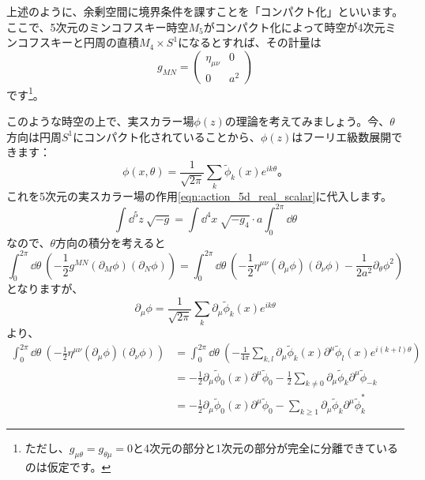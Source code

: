 \documentclass[unicode,a4paper,10pt]{ltjsarticle}
\begin{document}
上述のように、余剰空間に境界条件を課すことを「コンパクト化」といいます。ここで、5次元のミンコフスキー時空$M_{5}$がコンパクト化によって時空が4次元ミンコフスキーと円周の直積$M_{4}\times S^{1}$になるとすれば、その計量は
\begin{equation}
   g_{MN}
   =
   \begin{pmatrix}
      \eta_{\mu\nu} & 0 \\
      0 & a^2
   \end{pmatrix}
\end{equation}
です\footnote{
   ただし、$g_{\mu\theta}=g_{\theta\mu}=0$と4次元の部分と1次元の部分が完全に分離できているのは仮定です。
}。

このような時空の上で、実スカラー場$\phi(z)$の理論を考えてみましょう。今、$\theta$方向は円周$S^{1}$にコンパクト化されていることから、$\phi(z)$はフーリエ級数展開できます：
\begin{equation}
   \phi(x,\theta)
   =
   \frac{1}{\sqrt{2\pi}}
   \sum_{k}\tilde{\phi}_{k}(x)e^{ik\theta}
   \text{。}
\end{equation}
これを5次元の実スカラー場の作用\eqref{eqn:action_5d_real_scalar}に代入します。
\begin{equation}
   \int\dd^5 z\ 
   \sqrt{-g}
   =
   \int\dd^4 x\ \sqrt{-g_{4}}
   \cdot
   a\int_{0}^{2\pi}\dd \theta
\end{equation}
なので、$\theta$方向の積分を考えると
\begin{equation}
   \int_{0}^{2\pi}\dd \theta\ 
   \left(  
      -\frac{1}{2}g^{MN}(\partial_{M}\phi)(\partial_{N}\phi)
   \right)
   =
   \int_{0}^{2\pi}\dd \theta\ 
   \left(  
      -
      \frac{1}{2}\eta^{\mu\nu}(\partial_{\mu}\phi)(\partial_{\nu}\phi)
      -
      \frac{1}{2a^2}\partial_{\theta}\phi^2
   \right)   
   \label{eqn:2_1}
\end{equation}
となりますが、
\begin{equation}
   \partial_{\mu}\phi
   =
   \frac{1}{\sqrt{2\pi}}
   \sum_{k}\partial_{\mu}\tilde{\phi}_{k}(x)e^{ik\theta}
\end{equation}
より、
\begin{align}
   \int_{0}^{2\pi}\dd \theta\ 
   \left(  
      -
      \frac{1}{2}\eta^{\mu\nu}(\partial_{\mu}\phi)(\partial_{\nu}\phi)
   \right)   
   &=
   \int_{0}^{2\pi}\dd \theta\ 
   \left(  
      -\frac{1}{4\pi}\sum_{k,l}\partial_{\mu}\tilde{\phi}_{k}(x)\partial^{\mu}\tilde{\phi}_{l}(x)e^{i(k+l)\theta}
   \right)
   \nonumber
   \\
   &=
   -\frac{1}{2}\partial_{\mu}\tilde{\phi}_{0}(x)\partial^{\mu}\tilde{\phi}_{0}
   -\frac{1}{2}\sum_{k\neq 0}\partial_{\mu}\tilde{\phi}_{k}\partial^{\mu}\tilde{\phi}_{-k}
   \nonumber
   \\
   &=
   -\frac{1}{2}\partial_{\mu}\tilde{\phi}_{0}(x)\partial^{\mu}\tilde{\phi}_{0}
   -\sum_{k\geq 1}\partial_{\mu}\tilde{\phi}_{k}\partial^{\mu}\tilde{\phi}_{k}^{\ast}
\end{align}
\end{document}

